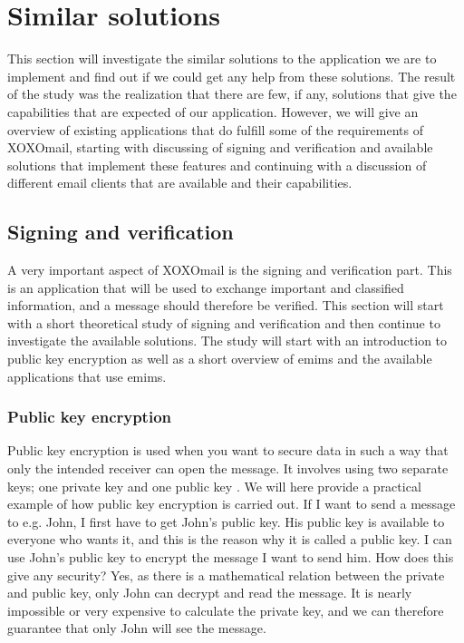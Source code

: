 

\section{Similar solutions}

This section will investigate the similar solutions to the application we are to implement and find out if we could get any help from these solutions. The result of the study was the realization that there are few, if any, solutions that give the capabilities that are expected of our application. However, we will give an overview of existing applications that do fulfill some of the requirements of XOXOmail, starting with discussing of signing and verification and available solutions that implement these features and continuing with a discussion of different email clients that are available and their capabilities.

\subsection{Signing and verification}

A very important aspect of XOXOmail is the signing and verification part. This is an application that will be used to exchange important and classified information, and a message should therefore be verified. This section will start with a short theoretical study of signing and verification and then continue to investigate the available solutions. The study will start with an introduction to public key encryption as well as a short overview of \gls{emims} and the available applications that use \gls{emims}.

\newpage

\subsubsection{Public key encryption}
Public key encryption is used when you want to secure data in such a way that only the intended receiver can open the message. It involves using two separate keys; one private key and one public key \cite{bib:pke}. We will here provide a practical example of how public key encryption is carried out.
\newline
\newline
If I want to send a message to e.g. John, I first have to get John's public key. His public key is available to everyone who wants it, and this is the reason why it is called a public key. I can use John's public key to encrypt the message I want to send him. How does this give any security? Yes, as there is a mathematical relation between the private and public key, only John can decrypt and read the message. It is nearly impossible or very expensive to calculate the private key, and we can therefore guarantee that only John will see the message.

